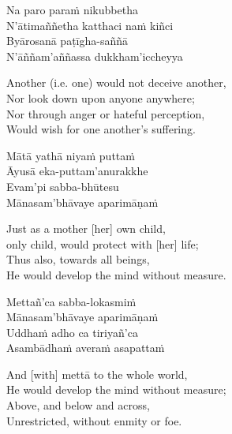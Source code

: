 \begin{pali-hang-continued}
  Na paro paraṁ nikubbetha\\
  N'ātimaññetha katthaci naṁ kiñci\\
  Byārosanā paṭīgha-saññā\\
  N'āññam'aññassa dukkham'iccheyya
\end{pali-hang-continued}

\begin{english-verses}
  Another (i.e. one) would not deceive another,\\
  Nor look down upon anyone anywhere;\\
  Nor through anger or hateful perception,\\
  Would wish for one another's suffering.
\end{english-verses}

\begin{pali-hang-continued}
  Mātā yathā niyaṁ puttaṁ\\
  Āyusā eka-puttam'anurakkhe\\
  Evam'pi sabba-bhūtesu\\
  Mānasam'bhāvaye aparimāṇaṁ
\end{pali-hang-continued}

\begin{english-verses}
  Just as a mother [her] own child,\\\relax
  [Her] only child, would protect with [her] life; \\
  Thus also, towards all beings,\\
  He would develop the mind without measure.
\end{english-verses}

\begin{pali-hang-continued}
  Mettañ'ca sabba-lokasmiṁ\\
  Mānasam'bhāvaye aparimāṇaṁ\\
  Uddhaṁ adho ca tiriyañ'ca\\
  Asambādhaṁ averaṁ asapattaṁ
\end{pali-hang-continued}

\begin{english-verses}
  And [with] mettā to the whole world,\\
  He would develop the mind without measure;\\
  Above, and below and across,\\
  Unrestricted, without enmity or foe.
\end{english-verses}


